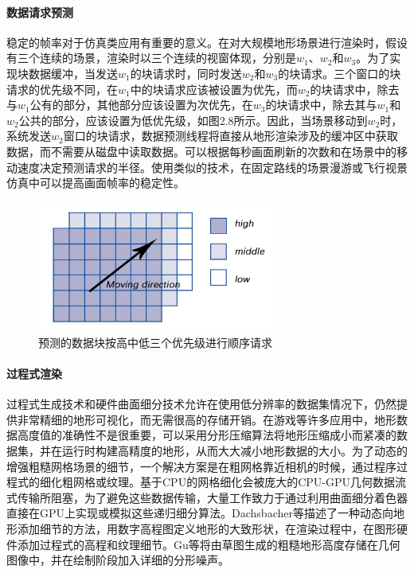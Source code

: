 \paragraph{数据请求预测}
稳定的帧率对于仿真类应用有重要的意义。在对大规模地形场景进行渲染时，假设有三个连续的场景，渲染时以三个连续的视窗体现，分别是$w_1$、$w_2$和$w_3$。为了实现块数据缓冲，当发送$w_1$的块请求时，同时发送$w_2$和$w_3$的块请求。三个窗口的块请求的优先级不同，在$w_1$中的块请求应该被设置为优先，而$w_2$的块请求中，除去与$w_1$公有的部分，其他部分应该设置为次优先，在$w_3$的块请求中，除去其与$w_1$和$w_2$公共的部分，应该设置为低优先级，如图2.8所示。因此，当场景移动到$w_2$时，系统发送$w_2$窗口的块请求，数据预测线程将直接从地形渲染涉及的缓冲区中获取数据，而不需要从磁盘中读取数据。可以根据每秒画面刷新的次数和在场景中的移动速度决定预测请求的半径。使用类似的技术，在固定路线的场景漫游或飞行视景仿真中可以提高画面帧率的稳定性。\supercite{Chen2010Design}
\begin{figure}[htbp]
\centering
\includegraphics[height=4.3cm,width=7.8cm]{figures/predic.JPG}
\caption{预测的数据块按高中低三个优先级进行顺序请求}
\end{figure}

\paragraph{过程式渲染}
过程式生成技术和硬件曲面细分技术允许在使用低分辨率的数据集情况下，仍然提供非常精细的地形可视化，而无需很高的存储开销。在游戏等许多应用中，地形数据高度值的准确性不是很重要，可以采用分形压缩算法将地形压缩成小而紧凑的数据集，并在运行时构建高精度的地形，从而大大减小地形数据的大小。为了动态的增强粗糙网格场景的细节，一个解决方案是在粗网格靠近相机的时候，通过程序过程式的细化粗网格或纹理。基于CPU的网格细化会被庞大的CPU-GPU几何数据流式传输所阻塞，为了避免这些数据传输，大量工作致力于通过利用曲面细分着色器直接在GPU上实现或模拟这些递归细分算法。Dachsbacher等\supercite{Dachsbacher2004Rendering}描述了一种动态向地形添加细节的方法，用数字高程图定义地形的大致形状，在渲染过程中，在图形硬件添加过程式的高程和纹理细节。Gu等\supercite{GuGeometry}将由草图生成的粗糙地形高度存储在几何图像中，并在绘制阶段加入详细的分形噪声。\par

